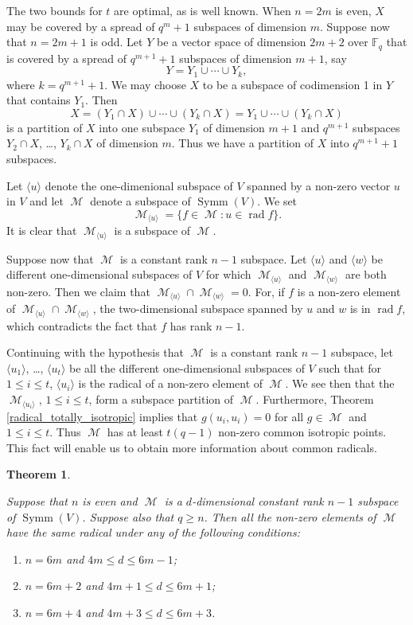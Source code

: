 \documentclass{amsart}
\DeclareMathOperator{\M}{\mathcal{M}}
\DeclareMathOperator{\rad}{rad}
\DeclareMathOperator{\Symm}{Symm}
\theoremstyle{plain}
\newtheorem{theorem}{Theorem}
\theoremstyle{definition}
\begin{document}
The two bounds for $t$ are optimal, as is well known. When $n=2m$ is even, $X$ may be covered by a spread of $q^m+1$ subspaces of dimension
$m$. Suppose now that $n=2m+1$ is odd. Let $Y$ be a vector space of dimension $2m+2$ over $\mathbb{F}_q$ that is covered by 
a spread of $q^{m+1}+1$ subspaces of dimension $m+1$, say
\[
 Y=Y_1 \cup \cdots \cup Y_k,
\]
where $k=q^{m+1}+1$. We may choose $X$ to be a subspace of codimension 1 in $Y$ that contains $Y_1$. Then
\[
 X=(Y_1\cap X) \cup \cdots \cup (Y_k\cap X)=Y_1\cup \cdots \cup (Y_k\cap X)
\]
is a partition of $X$ into one subspace $Y_1$ of dimension $m+1$ and $q^{m+1}$ subspaces 
$Y_2\cap X$, \dots,  $Y_k\cap X$ of dimension $m$. Thus we have a partition of $X$ into $q^{m+1}+1$ subspaces. 

Let $\langle u\rangle$ denote the one-dimenional subspace of $V$ spanned by a non-zero vector $u$ in $V$ and let $\M$ denote a subspace
of $\Symm(V)$. We set
\[
 \M_{\langle u\rangle}=\{ f\in \M: u\in \rad f\}.
\]
It is clear that $\M_{\langle u\rangle}$ is a subspace of $\M$. 

Suppose now that $\M$ is a constant rank $n-1$ subspace. Let $\langle u\rangle$ and $\langle w\rangle$ be different one-dimensional subspaces of $V$ for which $\M_{\langle u\rangle}$ and $\M_{\langle w\rangle}$ are both non-zero. Then we claim that $\M_{\langle u\rangle}\cap \M_{\langle w\rangle}=0$. For, if $f$ is a non-zero element of $\M_{\langle u\rangle}\cap \M_{\langle w\rangle}$, the two-dimensional subspace spanned by
$u$ and $w$ is in $\rad f$, which contradicts the fact that $f$ has rank $n-1$. 

Continuing with the hypothesis that $\M$ is a constant rank $n-1$ subspace, let $\langle u_1\rangle$, \dots, $\langle u_t\rangle$ be all the different one-dimensional subspaces of $V$ such that for $1\leq i\leq t$, $\langle u_i\rangle$ is the radical of a non-zero element of $\M$. We see then that the $\M_{\langle u_i\rangle}$, $1\leq i\leq t$, form a subspace partition of $\M$. Furthermore, Theorem \ref{radical_totally_isotropic}
implies that $g(u_i,u_i)=0$ for all $g\in \M$ and $1\leq i\leq t$. Thus $\M$ has at least $t(q-1)$ non-zero common isotropic points. This fact will enable us to obtain more information about common radicals.

\begin{theorem} \label{improved_common_radicals}
 
 Suppose that $n$ is even and $\M$ is a $d$-dimensional constant rank $n-1$ subspace of $\Symm(V)$. Suppose also that $q\geq n$. Then all the non-zero elements of $\M$ have the same radical under any of the following conditions:

\begin{enumerate}
\item $n=6m$ and $4m\leq d\leq 6m-1$;
\item $n=6m+2$ and $4m+1\leq d\leq 6m+1$;
\item $n=6m+4$ and $4m+3\leq d\leq 6m+3$.
\end{enumerate}
\end{theorem}
\end{document}
